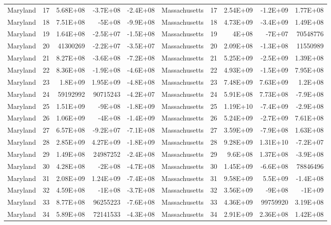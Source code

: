\begin{table}[]
\begin{tabular}{lrrrrlrrrr}
		Maryland &  17 & 5.68E+08 & -3.7E+08 & -2.4E+08 & Massachusetts &  17 & 2.54E+09 & -1.2E+09 & 1.77E+08 \\
		Maryland &  18 & 7.51E+08 & -5E+08 & -9.9E+08 & Massachusetts &  18 & 4.73E+09 & -3.4E+09 & 1.49E+08 \\
		Maryland &  19 & 1.64E+08 & -2.5E+07 & -1.5E+08 & Massachusetts &  19 & 4E+08 & -7E+07 & 70548776 \\
		Maryland &  20 & 41300269 & -2.2E+07 & -3.5E+07 & Massachusetts &  20 & 2.09E+08 & -1.3E+08 & 11550989 \\
		Maryland &  21 & 8.27E+08 & -3.6E+08 & -7.2E+08 & Massachusetts &  21 & 5.25E+09 & -2.5E+09 & 1.39E+08 \\
		Maryland &  22 & 8.36E+08 & -1.9E+08 & -4.6E+08 & Massachusetts &  22 & 4.93E+09 & -1.5E+09 & 7.95E+08 \\
		Maryland &  23 & 1.8E+09 & 1.95E+09 & -4.8E+08 & Massachusetts &  23 & 7.48E+09 & 7.63E+09 & 1.2E+08 \\
		Maryland &  24 & 59192992 & 90715243 & -4.2E+07 & Massachusetts &  24 & 5.91E+08 & 7.73E+08 & -7.9E+08 \\
		Maryland &  25 & 1.51E+09 & -9E+08 & -1.8E+09 & Massachusetts &  25 & 1.19E+10 & -7.4E+09 & -2.9E+08 \\
		Maryland &  26 & 1.06E+09 & -4E+08 & -1.4E+09 & Massachusetts &  26 & 5.24E+09 & -2.7E+09 & 7.61E+08 \\
		Maryland &  27 & 6.57E+08 & -9.2E+07 & -7.1E+08 & Massachusetts &  27 & 3.59E+09 & -7.9E+08 & 1.63E+08 \\
		Maryland &  28 & 2.85E+09 & 4.27E+09 & -1.8E+09 & Massachusetts &  28 & 9.28E+09 & 1.31E+10 & -7.2E+07 \\
		Maryland &  29 & 1.49E+08 & 24987252 & -2.4E+08 & Massachusetts &  29 & 9.6E+08 & 1.37E+08 & -3.9E+08 \\
		Maryland &  30 & 4.28E+08 & -2E+08 & -4.7E+08 & Massachusetts &  30 & 1.45E+09 & -6.6E+08 & 78846496 \\
		Maryland &  31 & 2.08E+09 & 1.24E+09 & -7.4E+08 & Massachusetts &  31 & 9.58E+09 & 5.5E+09 & -1.4E+08 \\
		Maryland &  32 & 4.59E+08 & -1E+08 & -3.7E+08 & Massachusetts &  32 & 3.56E+09 & -9E+08 & -1E+09 \\
		Maryland &  33 & 8.77E+08 & 96255223 & -7.6E+08 & Massachusetts &  33 & 4.36E+09 & 99759920 & 3.19E+08 \\
		Maryland &  34 & 5.89E+08 & 72141533 & -4.3E+08 & Massachusetts &  34 & 2.91E+09 & 2.36E+08 & 1.42E+08
	\end{tabular}
\end{table}

